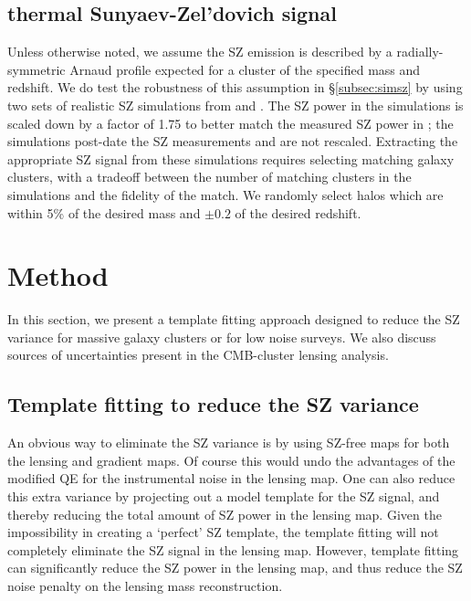 \subsection{thermal Sunyaev-Zel'dovich signal}
\label{sec_tsz}

Unless otherwise noted, we assume the SZ emission is described by a radially-symmetric  Arnaud profile \citep{arnaud10} expected for a cluster of the specified mass and redshift. 
We do test the robustness of this assumption in \S\ref{subsec:simsz} by using two sets of realistic SZ simulations from \citet{sehgal10} and \citet{takahashi17}. 
The SZ power in the \citep{sehgal10} simulations is scaled down by a factor of 1.75 to better match the measured SZ power in \cite{george15}; the \citet{takahashi17} simulations post-date the SZ measurements and are not rescaled. 
Extracting the appropriate SZ signal from these simulations requires selecting matching galaxy clusters, with a tradeoff between the number of matching clusters in the simulations and the fidelity of the match. 
 We randomly select halos which are within 5\% of the desired mass and $\pm 0.2$ of the desired redshift.

\section{Method}
\label{sec_methods}
In this section, we present a template fitting approach designed to reduce the SZ variance for massive galaxy clusters or for low noise surveys. 
We also discuss sources of uncertainties present in the CMB-cluster lensing analysis. 
\subsection{Template fitting to reduce the SZ variance}
\label{sec_sz_template_fitting}

An obvious way to eliminate the SZ variance is by using SZ-free maps for both the lensing and gradient maps. 
Of course this would undo the advantages of the modified QE for the instrumental noise in the lensing map. 
One can also reduce this extra variance by projecting out a model template for the SZ signal, and thereby reducing the total amount of SZ power in the lensing map. 
Given the impossibility in creating a `perfect' SZ template, the template fitting will not completely eliminate the SZ signal in the lensing map. 
However, template fitting can significantly reduce the SZ power in the lensing map, and thus reduce the SZ noise penalty on the lensing mass reconstruction. 



